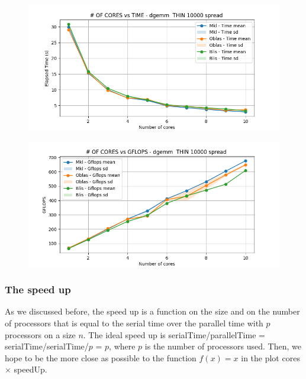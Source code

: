 \documentclass[12pt, titlepage]{report}
\begin{document}
\begin{figure}[H]
    \centering
    \includegraphics[width=\textwidth]{THIN scalability deep/dgemm__THIN_10000_spread_time.png}
\end{figure}

\begin{figure}[H]
    \centering
    \includegraphics[width=\textwidth]{THIN scalability deep/dgemm__THIN_10000_spread_gflops.png}
\end{figure}

\subsubsection{The speed up}
As we discussed before, the speed up is a function on the size and on the number of processors that is equal to the serial time over the parallel time with $p$ processors on a size $n$.
The ideal speed up is serialTime/parallelTime = serialTime/serialTime/$p$ = $p$, where $p$ is the number of processors used. Then, we hope to be the more close as possible to the function $f(x) = x $ in the plot cores $\times$ speedUp.
\end{document}
